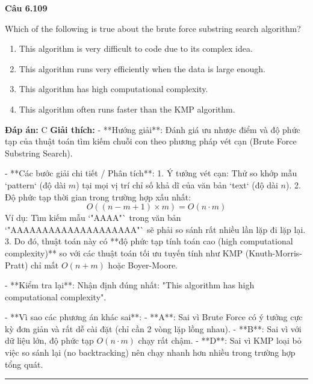 \documentclass[11pt,a4paper]{article}
\newenvironment{question}[1]{%
  \par\vspace{1em}\noindent\textbf{\large Câu #1}\par\vspace{0.4em}
}{%
  \par\vspace{1em}\hrule\vspace{0.6em}
}
\newenvironment{choices}{%
  \begin{enumerate}[label=\textbf{\Alph*.},leftmargin=2.2em,itemsep=2pt,topsep=3pt]
}{%
  \end{enumerate}
}
\newcommand{\choice}{\item}
\begin{document}
\begin{question}{6.109}
Which of the following is true about the brute force substring search algorithm?
\begin{choices}
\choice This algorithm is very difficult to code due to its complex idea.
\choice This algorithm runs very efficiently when the data is large enough.
\choice This algorithm has high computational complexity.
\choice This algorithm often runs faster than the KMP algorithm.
\end{choices}
\textbf{Đáp án:} C
\textbf{Giải thích:} - **Hướng giải**:
  Đánh giá ưu nhược điểm và độ phức tạp của thuật toán tìm kiếm chuỗi con theo phương pháp vét cạn (Brute Force Substring Search).

- **Các bước giải chi tiết / Phân tích**:
  1. Ý tưởng vét cạn: Thử so khớp mẫu `pattern` (độ dài \(m\)) tại mọi vị trí chỉ số khả dĩ của văn bản `text` (độ dài \(n\)).
  2. Độ phức tạp thời gian trong trường hợp xấu nhất:
     \[
     O((n - m + 1) \times m) = O(n \cdot m)
     \]
     Ví dụ: Tìm kiếm mẫu `"AAAA"` trong văn bản `"AAAAAAAAAAAAAAAAAAAA"` sẽ phải so sánh rất nhiều lần lặp đi lặp lại.
  3. Do đó, thuật toán này có **độ phức tạp tính toán cao (high computational complexity)** so với các thuật toán tối ưu tuyến tính như KMP (Knuth-Morris-Pratt) chỉ mất \(O(n + m)\) hoặc Boyer-Moore.

- **Kiểm tra lại**:
  Nhận định đúng nhất: "This algorithm has high computational complexity".

- **Vì sao các phương án khác sai**:
  - **A**: Sai vì Brute Force có ý tưởng cực kỳ đơn giản và rất dễ cài đặt (chỉ cần 2 vòng lặp lồng nhau).
  - **B**: Sai vì với dữ liệu lớn, độ phức tạp \(O(n \cdot m)\) chạy rất chậm.
  - **D**: Sai vì KMP loại bỏ việc so sánh lại (no backtracking) nên chạy nhanh hơn nhiều trong trường hợp tổng quát.
\end{question}
\end{document}
